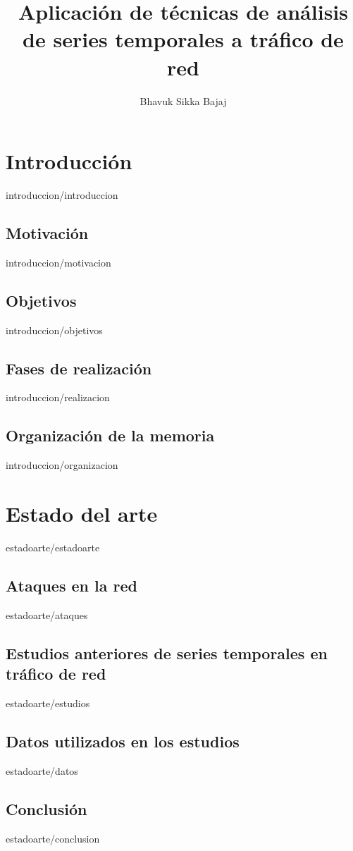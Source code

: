 \documentclass[epsbased,copyright,final,printable,covers,extendedindex,firstnumbered,tfg,gnuplot]{tfgtfmthesisuam}
\title{Aplicación de técnicas de análisis de series temporales a tráfico de red}
\author{Bhavuk Sikka Bajaj}
\begin{document}


\chapter{Introducción\label{CAP:INTRODUCCION}}{introduccion/introduccion}
  \section{Motivación\label{SEC:MOTIVACION}}{introduccion/motivacion}
  \section{Objetivos\label{SEC:OBJETIVOS}}{introduccion/objetivos}
  \section{Fases de realización\label{SEC:REALIZACION}}{introduccion/realizacion}
  \section{Organización de la memoria\label{SEC:ORGANIZACION}}{introduccion/organizacion}

\chapter{Estado del arte\label{CAP:ESTADOARTE}}{estadoarte/estadoarte}
  \section{Ataques en la red\label{SEC:ATAQUES}}{estadoarte/ataques}
  \section{Estudios anteriores de series temporales en tráfico de red\label{SEC:ESTUDIOS}}{estadoarte/estudios} %
  \section{Datos utilizados en los estudios\label{SEC:DATOS}}{estadoarte/datos}
  \section{Conclusión\label{SEC:EACONCLUSION}}{estadoarte/conclusion}
\end{document}
